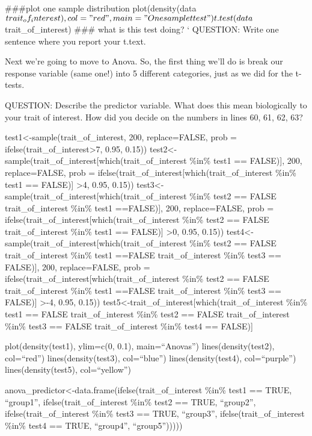 \documentclass[
]{article}
\begin{document}
\#\#\#plot one sample distribution
plot(density(data\(trait_of_interest), col="red", main="One sample t test")
t.test(data\)trait\_of\_interest) \#\#\# what is this test doing? `
QUESTION: Write one sentence where you report your t.text.

Next we're going to move to Anova. So, the first thing we'll do is break
our response variable (same one!) into 5 different categories, just as
we did for the t-tests.

QUESTION: Describe the predictor variable. What does this mean
biologically to your trait of interest. How did you decide on the
numbers in lines 60, 61, 62, 63?

test1\textless-sample(trait\_of\_interest, 200, replace=FALSE, prob =
ifelse(trait\_of\_interest\textgreater7, 0.95, 0.15))
test2\textless-sample(trait\_of\_interest{[}which(trait\_of\_interest
\%in\% test1 == FALSE){]}, 200, replace=FALSE, prob =
ifelse(trait\_of\_interest{[}which(trait\_of\_interest \%in\% test1 ==
FALSE){]} \textgreater4, 0.95, 0.15))
test3\textless-sample(trait\_of\_interest{[}which(trait\_of\_interest
\%in\% test2 == FALSE \textbar{} trait\_of\_interest \%in\% test1
==FALSE){]}, 200, replace=FALSE, prob =
ifelse(trait\_of\_interest{[}which(trait\_of\_interest \%in\% test2 ==
FALSE \textbar{} trait\_of\_interest \%in\% test1 == FALSE){]}
\textgreater0, 0.95, 0.15))
test4\textless-sample(trait\_of\_interest{[}which(trait\_of\_interest
\%in\% test2 == FALSE \textbar{} trait\_of\_interest \%in\% test1
==FALSE \textbar{} trait\_of\_interest \%in\% test3 == FALSE){]}, 200,
replace=FALSE, prob =
ifelse(trait\_of\_interest{[}which(trait\_of\_interest \%in\% test2 ==
FALSE \textbar{} trait\_of\_interest \%in\% test1 ==FALSE \textbar{}
trait\_of\_interest \%in\% test3 == FALSE){]} \textgreater-4, 0.95,
0.15)) test5\textless-trait\_of\_interest{[}which(trait\_of\_interest
\%in\% test1 == FALSE\textbar{} trait\_of\_interest \%in\% test2 ==
FALSE \textbar{} trait\_of\_interest \%in\% test3 == FALSE \textbar{}
trait\_of\_interest \%in\% test4 == FALSE){]}

plot(density(test1), ylim=c(0, 0.1), main=``Anovas'')
lines(density(test2), col=``red'') lines(density(test3), col=``blue'')
lines(density(test4), col=``purple'') lines(density(test5),
col=``yellow'')

anova\_predictor\textless-data.frame(ifelse(trait\_of\_interest \%in\%
test1 == TRUE, ``group1'', ifelse(trait\_of\_interest \%in\% test2 ==
TRUE, ``group2'', ifelse(trait\_of\_interest \%in\% test3 == TRUE,
``group3'', ifelse(trait\_of\_interest \%in\% test4 == TRUE, ``group4'',
``group5'')))))
\end{document}
